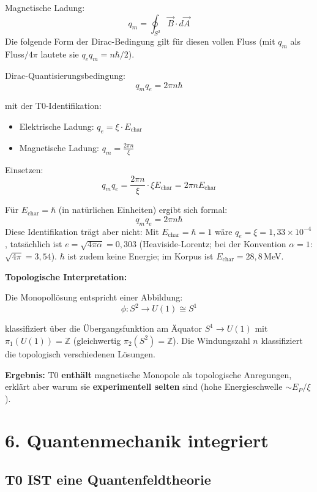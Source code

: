 	Magnetische Ladung:
	\[
	q_m = \oint_{S^2} \vec{B} \cdot d\vec{A}
	\]
	Die folgende Form der Dirac-Bedingung gilt für diesen vollen Fluss (mit $q_m$ als Fluss$/4\pi$ lautete sie $q_e q_m = n\hbar/2$).
	
	Dirac-Quantisierungsbedingung:
	\[
	q_m q_e = 2\pi n \hbar
	\]
	
	mit der T0-Identifikation:
	\begin{itemize}
		\item Elektrische Ladung: $q_e = \xi \cdot E_{\text{char}}$
		\item Magnetische Ladung: $q_m = \frac{2\pi n}{\xi}$
	\end{itemize}
	
	Einsetzen:
	\[
	q_m q_e = \frac{2\pi n}{\xi} \cdot \xi E_{\text{char}} = 2\pi n E_{\text{char}}
	\]
	
	Für $E_{\text{char}} = \hbar$ (in natürlichen Einheiten) ergibt sich formal:
	\[
	q_m q_e = 2\pi n \hbar
	\]
	Diese Identifikation trägt aber nicht: Mit $E_{\text{char}} = \hbar = 1$ wäre $q_e = \xi = 1{,}33\times10^{-4}$, tatsächlich ist $e = \sqrt{4\pi\alpha} = 0{,}303$ (Heaviside-Lorentz; bei der Konvention $\alpha = 1$: $\sqrt{4\pi} = 3{,}54$). $\hbar$ ist zudem keine Energie; im Korpus ist $E_{\text{char}} = 28{,}8$\,MeV.
	
	\textbf{Topologische Interpretation:}
	
	Die Monopollösung entspricht einer Abbildung:
	\[
	\phi: S^2 \to U(1) \cong S^1
	\]
	
	klassifiziert über die Übergangsfunktion am Äquator $S^1 \to U(1)$ mit $\pi_1(U(1)) = \mathbb{Z}$ (gleichwertig $\pi_2(S^2) = \mathbb{Z}$). Die Windungszahl $n$ klassifiziert die topologisch verschiedenen Lösungen.
	
	\textbf{Ergebnis:} T0 \textbf{enthält} magnetische Monopole als topologische Anregungen, erklärt aber warum sie \textbf{experimentell selten} sind (hohe Energieschwelle $\sim E_P/\xi$).
	
	\section*{6. Quantenmechanik integriert}
	
	\subsection*{\textbf{T0 IST eine Quantenfeldtheorie}}
	
